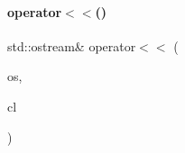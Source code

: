\mbox{\label{_compatibility_8h_a4dba78c90980468354692db49af6847b}} 
\paragraph{\texorpdfstring{operator$<$$<$()}{operator<<()}}
{\footnotesize\ttfamily std\+::ostream\& operator$<$$<$ (\begin{DoxyParamCaption}\item[{std\+::ostream \&}]{os,  }\item[{const \mbox{\hyperlink{class_compatibility_list}{Compatibility\+List}} \&}]{cl }\end{DoxyParamCaption})}


